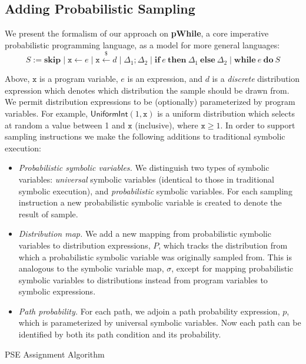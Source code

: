 \subsection{Adding Probabilistic Sampling}
We present the formalism of our approach on \textbf{pWhile}, a core imperative probabilistic programming language, as a model for more general languages:
% 
\[
S := \mathbf{skip} \mid \mathtt{x} \leftarrow e \mid \mathtt{x} \xleftarrow{\$} d \mid \Delta_1 ; \Delta_2 \mid \mathbf{if}~e~\mathbf{then}~\Delta_1~\mathbf{else}~\Delta_2 \mid \mathbf{while}~e~\mathbf{do}~S 
\]

Above, $\mathtt{x}$ is a program variable, $e$ is an expression, and $d$ is a \textit{discrete} distribution expression which denotes which distribution the sample should be drawn from.
% 
We permit distribution expressions to be (optionally) parameterized by program variables.
% 
For example, $\mathsf{UniformInt}(1,\mathtt{x})$ is a uniform distribution which selects at random a value between 1 and $\mathtt{x}$ (inclusive), where $\mathtt{x} \geq 1$.
% 
In order to support sampling instructions we make the following additions to traditional symbolic execution:
% 
\begin{itemize}
	\item \textit{Probabilistic symbolic variables.} We distinguish two types of symbolic variables: \textit{universal} symbolic variables (identical to those in traditional symbolic execution), and \textit{probabilistic} symbolic variables.
	For each sampling instruction a new probabilistic symbolic variable is created to denote the result of sample.
	\item \textit{Distribution map.} We add a new mapping from probabilistic symbolic variables to distribution expressions, $P$, which tracks the distribution from which a probabilistic symbolic variable was originally sampled from.
	This is analogous to the symbolic variable map, $\sigma$, except for mapping probabilistic symbolic variables to distributions instead from program variables to symbolic expressions.
	\item \textit{Path probability.} For each path, we adjoin a path probability expression, $p$, which is parameterized by universal symbolic variables.
	Now each path can be identified by both its path condition and its probability.
\end{itemize}

\begin{algorithm}[H]
	\caption{PSE Assignment Algorithm}
	\label{alg:assign}
	\begin{algorithmic}[1]
		\State{}
		\EndFunction
	\end{algorithmic}
\end{algorithm}

